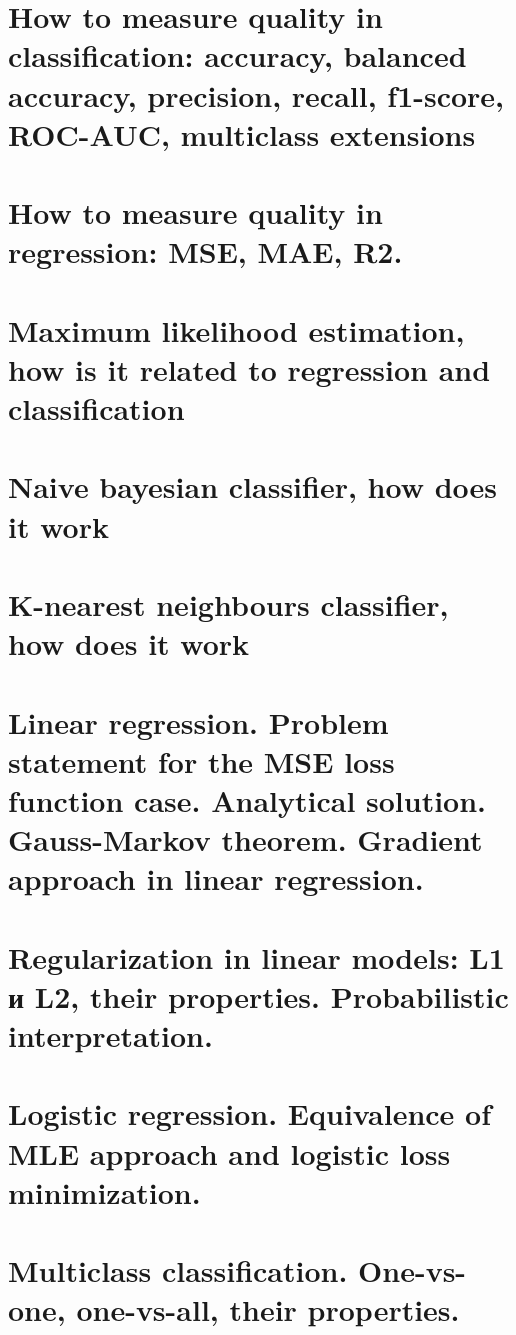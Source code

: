 \section{How to measure quality in classification: accuracy, balanced accuracy, precision, recall, f1-score, ROC-AUC, multiclass extensions}


\section{How to measure quality in regression: MSE, MAE, R2.}


\section{ Maximum likelihood estimation, how is it related to regression and classification}


\section{Naive bayesian classifier, how does it work}


\section{K-nearest neighbours classifier, how does it work}


\section{Linear regression. Problem statement for the MSE loss function case. Analytical solution. Gauss-Markov theorem. Gradient approach in linear regression.}


\section{Regularization in linear models: L1 и L2, their properties. Probabilistic interpretation.}


\section{Logistic regression. Equivalence of MLE approach and logistic loss minimization.}


\section{Multiclass classification. One-vs-one, one-vs-all, their properties.}


